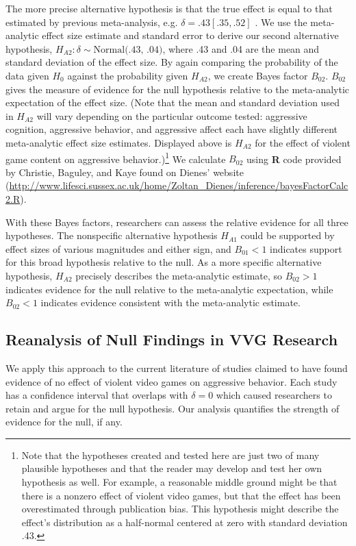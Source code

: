 \documentclass[man]{apa6}
\begin{document}
The more precise alternative hypothesis is that the true effect is equal to that estimated by previous meta-analysis, e.g. $\delta = .43 [.35, .52]$ \citep{Anderson:etal:2010}.  We use the meta-analytic effect size estimate and standard error to derive our second alternative hypothesis, $H_{A2}: \delta \sim{} \mbox{Normal(.43, .04)}$, where .43 and .04 are the mean and standard deviation of the effect size. 
By again comparing the probability of the data given $H_0$ against the probability given $H_{A2}$, we create Bayes factor $B_{02}$. $B_{02}$ gives the measure of evidence for the null hypothesis relative to the meta-analytic expectation of the effect size. (Note that the mean and standard deviation used in $H_{A2}$ will vary depending on the particular outcome tested: aggressive cognition, aggressive behavior, and aggressive affect each have slightly different meta-analytic effect size estimates. Displayed above is $H_{A2}$ for the effect of violent game content on aggressive behavior.)\footnote{Note that the hypotheses created and tested here are just two of many plausible hypotheses and that the reader may develop and test her own hypothesis as well. For example, a reasonable middle ground might be that there is a nonzero effect of violent video games, but that the effect has been overestimated through publication bias. This hypothesis might describe the effect's distribution as a half-normal centered at zero with standard deviation .43.} 
We calculate $B_{02}$ using {\bf R} code provided by Christie, Baguley, and Kaye found on Dienes' website (\url{http://www.lifesci.sussex.ac.uk/home/Zoltan_Dienes/inference/bayesFactorCalc2.R}).  %

With these Bayes factors, researchers can assess the relative evidence for all three hypotheses. The nonspecific alternative hypothesis $H_{A1}$ could be supported by effect sizes of various magnitudes and either sign, and $B_{01} < 1$ indicates support for this broad hypothesis relative to the null. As a more specific alternative hypothesis, $H_{A2}$ precisely describes the meta-analytic estimate, so $B_{02} > 1$ indicates evidence for the null relative to the meta-analytic expectation, while $B_{02} < 1$ indicates evidence consistent with the meta-analytic estimate. 

\subsection{Reanalysis of Null Findings in VVG Research}
We apply this approach to the current literature of studies claimed to have found evidence of no effect of violent video games on aggressive behavior. Each study has a confidence interval that overlaps with $\delta = 0$ which caused researchers to retain and argue for the null hypothesis. Our analysis quantifies the strength of evidence for the null, if any.
\end{document}
